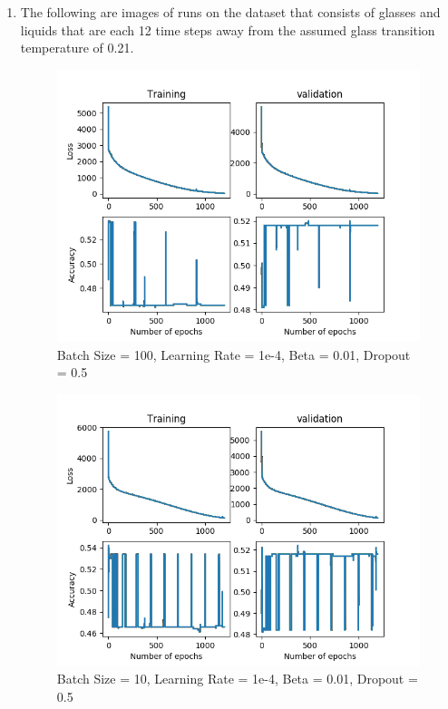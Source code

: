 \documentclass[12pt,reqno]{amsart}
\numberwithin{equation}{section}
\begin{document}
\begin{enumerate}
\item The following are images of runs on the dataset that consists of glasses and liquids that are each 12 time steps away from the assumed glass transition temperature of 0.21.  

\begin{figure}[H]
\centering
\includegraphics[scale=0.6]{data12-1e-4-100-1e-2-5e-1}
\caption{Batch Size = 100, Learning Rate = 1e-4, Beta = 0.01, Dropout = 0.5}
\end{figure}

\begin{figure}[H]
\centering
\includegraphics[scale=0.6]{data12-1e-4-10-1e-2-5e-1}
\caption{Batch Size = 10, Learning Rate = 1e-4, Beta = 0.01, Dropout = 0.5}
\end{figure}


\end{enumerate}
\end{document}
